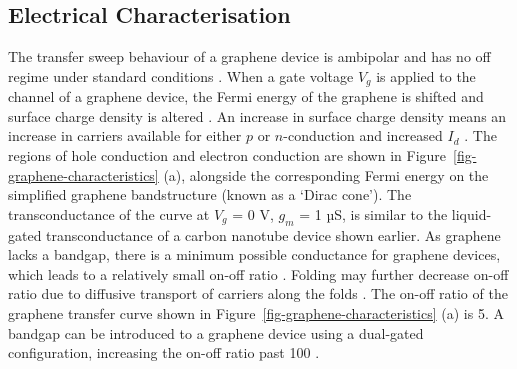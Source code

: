 \documentclass[
  a4paper,
]{scrbook}
\begin{document}
\hypertarget{sec-electrical-characterisation-graphene}{%
\subsection{Electrical
Characterisation}\label{sec-electrical-characterisation-graphene}}

The transfer sweep behaviour of a graphene device is ambipolar and has
no off regime under standard conditions
\autocite{Novoselov2004,Bartolomeo2011,Ohno2015}. When a gate voltage
\(V_g\) is applied to the channel of a graphene device, the Fermi energy
of the graphene is shifted and surface charge density is altered
\autocite{Novoselov2004,Heller2010,Ohno2015}. An increase in surface
charge density means an increase in carriers available for either \(p\)
or \(n\)-conduction and increased \(I_d\) \autocite{Geim2007}. The
regions of hole conduction and electron conduction are shown in
Figure~\ref{fig-graphene-characteristics} (a), alongside the
corresponding Fermi energy on the simplified graphene bandstructure
(known as a `Dirac cone'). The transconductance of the curve at \(V_g\)
= 0 V, \(g_m\) = 1 µS, is similar to the liquid-gated transconductance
of a carbon nanotube device shown earlier. As graphene lacks a bandgap,
there is a minimum possible conductance for graphene devices, which
leads to a relatively small on-off ratio
\autocite{Novoselov2004,Geim2007}. Folding may further decrease on-off
ratio due to diffusive transport of carriers along the folds
\autocite{Zhu2012}. The on-off ratio of the graphene transfer curve
shown in Figure~\ref{fig-graphene-characteristics} (a) is 5. A bandgap
can be introduced to a graphene device using a dual-gated configuration,
increasing the on-off ratio past 100 \autocite{Xia2010}.
\end{document}
